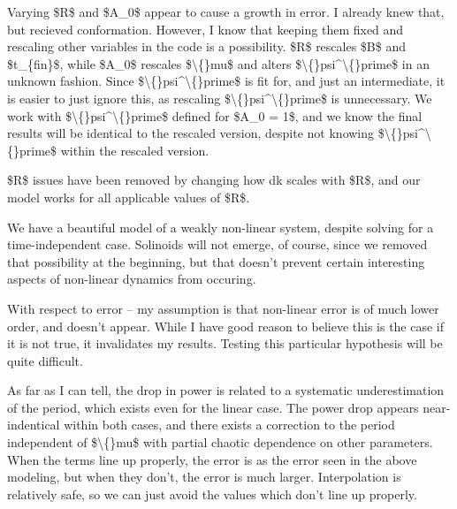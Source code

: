 \documentclass{article}
\begin{document}
Varying \$R\$ and \$A\_0\$ appear to cause a growth in error. I already knew that, but recieved conformation. However, I know that keeping them fixed and rescaling other variables in the code is a possibility. \$R\$ rescales \$B\$ and \$t\_\{fin\}\$, while \$A\_0\$ rescales \$\textbackslash\{\}mu\$ and alters \$\textbackslash\{\}psi\textasciicircum{}\textbackslash\{\}prime\$ in an unknown fashion. Since \$\textbackslash\{\}psi\textasciicircum{}\textbackslash\{\}prime\$ is fit for, and just an intermediate, it is easier to just ignore this, as rescaling \$\textbackslash\{\}psi\textasciicircum{}\textbackslash\{\}prime\$ is unnecessary. We work with \$\textbackslash\{\}psi\textasciicircum{}\textbackslash\{\}prime\$ defined for \$A\_0 = 1\$, and we know the final results will be identical to the rescaled version, despite not knowing \$\textbackslash\{\}psi\textasciicircum{}\textbackslash\{\}prime\$ within the rescaled version. 

\$R\$ issues have been removed by changing how dk scales with \$R\$, and our model works for all applicable values of \$R\$.

We have a beautiful model of a weakly non-linear system, despite solving for a time-independent case. Solinoids will not emerge, of course, since we removed that possibility at the beginning, but that doesn't prevent certain interesting aspects of non-linear dynamics from occuring.

With respect to error -- my assumption is that non-linear error is of much lower order, and doesn't appear. While I have good reason to believe this is the case if it is not true, it invalidates my results. Testing this particular hypothesis will be quite difficult.

As far as I can tell, the drop in power is related to a systematic underestimation of the period, which exists even for the linear case. The power drop appears near-indentical within both cases, and there exists a correction to the period independent of \$\textbackslash\{\}mu\$ with partial chaotic dependence on other parameters. When the terms line up properly, the error is as the error seen in the above modeling, but when they don't, the error is much larger. Interpolation is relatively safe, so we can just avoid the values which don't line up properly. 
\end{document}
